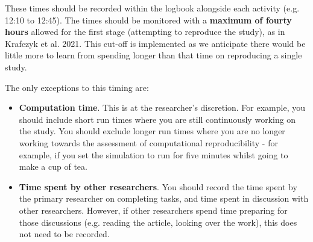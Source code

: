 These times should be recorded within the logbook alongside each activity (e.g. 12:10 to 12:45). The times should be monitored with a \textbf{maximum of fourty hours} allowed for the first stage (attempting to reproduce the study), as in Krafczyk et al. 2021.\autocite{krafczyk_learning_2021} This cut-off is implemented as we anticipate there would be little more to learn from spending longer than that time on reproducing a single study.

The only exceptions to this timing are:
\begin{itemize}
    \item \textbf{Computation time}. This is at the researcher's discretion. For example, you should include short run times where you are still continuously working on the study. You should exclude longer run times where you are no longer working towards the assessment of computational reproducibility - for example, if you set the simulation to run for five minutes whilst going to make a cup of tea.
    \item \textbf{Time spent by other researchers}. You should record the time spent by the primary researcher on completing tasks, and time spent in discussion with other researchers. However, if other researchers spend time preparing for those discussions (e.g. reading the article, looking over the work), this does not need to be recorded.
\end{itemize}